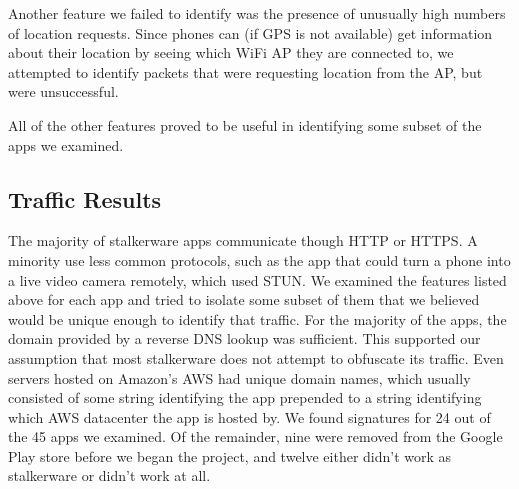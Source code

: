 \documentclass[acmtog]{acmart}
\begin{document}
Another feature we failed to identify was the presence of unusually high 
numbers of location requests. Since phones can (if GPS is not available) get 
information about their location by seeing which WiFi AP they are connected to, 
we attempted to identify packets that were requesting location from the AP, but 
were unsuccessful.

All of the other features proved to be useful in identifying some subset of the 
apps we examined. 

\subsection{Traffic Results}

The majority of stalkerware apps communicate though HTTP or HTTPS. A minority 
use less common protocols, such as the app that could turn a phone into a live 
video camera remotely, which used STUN. We examined the features listed above 
for each app and tried to isolate some subset of them that we believed would be 
unique enough to identify that traffic. For the majority of the apps, the 
domain provided by a reverse DNS lookup was sufficient. This supported our 
assumption that most stalkerware does not attempt to obfuscate its traffic. 
Even servers hosted on Amazon's AWS had unique domain names, which usually 
consisted of some string identifying the app prepended to a string identifying 
which AWS datacenter the app is hosted by. We found signatures for 24 out of 
the 45 apps we examined. Of the remainder, nine were removed from the Google 
Play store before we began the project, and twelve either didn't work as 
stalkerware or didn't work at all.
\end{document}
